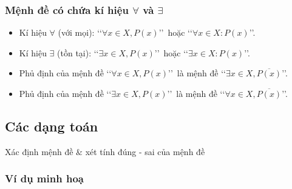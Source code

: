\begin{tomtat}
\subsubsection{Mệnh đề có chứa kí hiệu $\forall$ và $\exists$}

\begin{itemize}
	\item Kí hiệu $\forall$ (với mọi): \lq\lq$ \forall x \in X, P(x)$\rq\rq\ hoặc \lq\lq$ \forall x \in X : P(x)$\rq\rq.
	\item Kí hiệu $\exists$ (tồn tại): \lq\lq$ \exists x \in X, P(x)$\rq\rq\ hoặc \lq\lq$ \exists x \in X : P(x)$\rq\rq.
\end{itemize}

\begin{note}\hfil
	\begin{itemize}
		\item Phủ định của mệnh đề \lq\lq$ \forall x \in X, P(x)$\rq\rq\ là mệnh đề \lq\lq$ \exists x\in X, \overline{P(x)}$\rq\rq.
		\item Phủ định của mệnh đề \lq\lq$ \exists x\in X, P(x)$\rq\rq\ là mệnh đề  \lq\lq$ \forall x\in X, \overline{P(x)}$\rq\rq.
	\end{itemize}
\end{note}

\end{tomtat}


\subsection{Các dạng toán}

\begin{dang}{Xác định mệnh đề $\&$ xét tính đúng - sai của mệnh đề}
\end{dang}

\subsubsection{Ví dụ minh hoạ}

